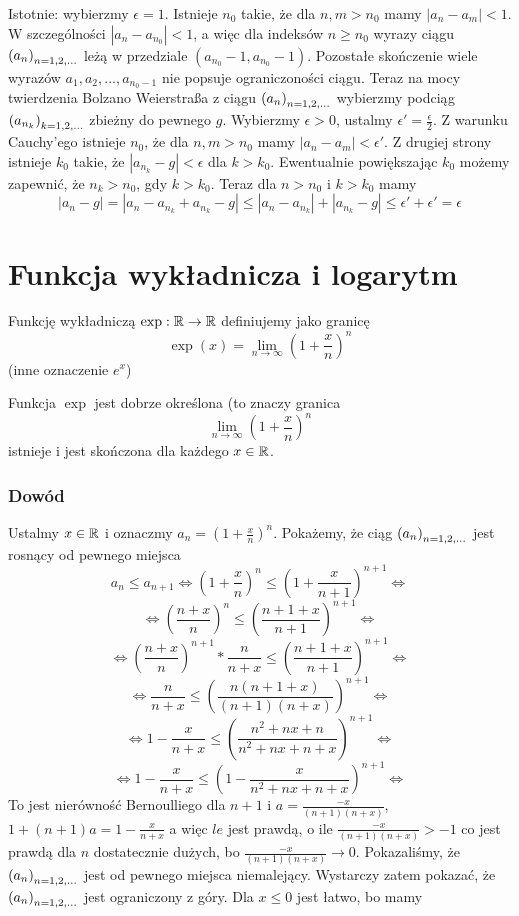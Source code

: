 \documentclass[9pt]{article}
\begin{document}
Istotnie: wybierzmy $\epsilon = 1$. Istnieje $n_0$ takie, że dla $n, m > n_0$ mamy $|a_n - a_m| <
1$. W szczególności $|a_n - a_{n_0}| < 1$, a więc dla indeksów $n \ge n_0$ wyrazy ciągu $\left(a_n\right)_{n = 1,2,...}$
leżą w przedziale $(a_{n_0} - 1, a_{n_0} - 1)$. Pozostałe skończenie wiele wyrazów $a_1, a_2, ...,
a_{n_0-1}$ nie popsuje ograniczoności ciągu. Teraz na mocy twierdzenia Bolzano Weierstraßa z ciągu
$\left(a_n\right)_{n = 1,2,...}$ wybierzmy podciąg $\left(a_{n_k}\right)_{k = 1,2,...}$ zbieżny do pewnego $g$. Wybierzmy $\epsilon > 0$,
ustalmy $\epsilon' = \frac{\epsilon}{2}$. Z warunku Cauchy'ego istnieje $n_0$, że dla $n, m > n_0$
mamy $|a_n - a_m| < \epsilon'$. Z drugiej strony istnieje $k_0$ takie, że $|a_{n_k} - g| < \epsilon$
dla $k > k_0$. Ewentualnie powiększając $k_0$ możemy zapewnić, że $n_k > n_0$, gdy $k > k_0$. Teraz
dla $n > n_0$ i $k > k_0$ mamy
\[
    |a_n - g| = |a_n - a_{n_k} + a_{n_k} - g| \le |a_n - a_{n_k}| + |a_{n_k} - g| \le \epsilon' +
    \epsilon' = \epsilon
\]

\section{Funkcja wykładnicza i logarytm}

\begin{Def}
    Funkcję wykładniczą $\exp: \mathbb{R} \to \mathbb{R}$ definiujemy jako granicę
    \[
        \exp(x) = \lim_{n \to \infty} \left(1+\frac{x}{n}\right)^n
    \]
    (inne oznaczenie $e^x$)
\end{Def}

\begin{Twi}
    Funkcja $\exp$ jest dobrze określona (to znaczy granica
    \[
        \lim_{n \to \infty} \left(1 + \frac{x}{n}\right)^n
    \]
    istnieje i jest skończona dla każdego $x \in \mathbb{R}$.
\end{Twi}

\subsubsection*{Dowód}

Ustalmy $x \in \mathbb{R}$ i oznaczmy $a_n = \left(1 + \frac{x}{n}\right)^n$. Pokażemy, że ciąg $\left(a_n\right)_{n = 1,2,...}$
jest rosnący od pewnego miejsca
\[
    a_n \le a_{n+1} \iff \left(1+\frac{x}{n}\right)^n \le \left(1+\frac{x}{n+1}\right)^{n+1} \iff
\]
\[
    \iff \left(\frac{n+x}{n}\right)^n \le \left(\frac{n+1+x}{n+1}\right)^{n+1} \iff
\]
\[
    \iff \left(\frac{n+x}{n}\right)^{n+1} * \frac{n}{n+x} \le \left(\frac{n+1+x}{n+1}\right)^{n+1} \iff
\]
\[
    \iff \frac{n}{n+x} \le \left(\frac{n(n+1+x)}{(n+1)(n+x)}\right)^{n+1} \iff
\]
\[
    \iff 1 - \frac{x}{n+x} \le \left(\frac{n^2 + nx + n}{n^2 + nx + n + x}\right)^{n+1} \iff
\]
\[
    \iff 1 - \frac{x}{n+x} \le \left(1 - \frac{x}{n^2 + nx + n + x}\right)^{n+1} \iff
\]
To jest nierówność Bernoulliego dla $n+1$ i $a = \frac{-x}{(n+1)(n+x)}$, $1 + (n+1)a = 1 -
\frac{x}{n+x}$ a więc $le$ jest prawdą, o ile $\frac{-x}{(n+1)(n+x)} > -1$ co jest prawdą dla $n$
dostatecznie dużych, bo $\frac{-x}{(n+1)(n+x)} \to 0$. Pokazaliśmy, że $\left(a_n\right)_{n = 1,2,...}$ jest od pewnego
miejsca niemalejący. Wystarczy zatem pokazać, że $\left(a_n\right)_{n = 1,2,...}$ jest ograniczony z góry. Dla $x \le 0$
jest łatwo, bo mamy
\end{document}
